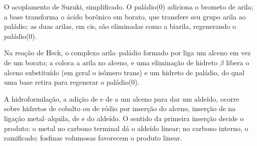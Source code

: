 \begin{omfigure}

{\small O acoplamento de Suzuki, simplificado. O paládio(0) adiciona o brometo de
arila; a base transforma o ácido borônico em borato, que transfere seu grupo
arila ao paládio; as duas arilas, em cis, são eliminadas como a biarila,
regenerando o paládio(0).}
\end{omfigure}

Na reação de Heck, o complexo arila--paládio formado por  liga
um alceno em vez de um borato; a  coloca a arila no alceno,
e uma eliminação de hidreto $\beta$ libera o alceno substituído (em geral o
isômero trans) e um hidreto de paládio, do qual uma base retira  para
regenerar o paládio(0).

A hidroformilação, a adição de  e de  a um alceno para dar um
aldeído, ocorre sobre hidretos de cobalto ou de ródio por inserção do alceno,
inserção de  na ligação metal--alquila,  de  e
 do aldeído. O sentido da primeira inserção decide o
produto: o metal no carbono terminal dá o aldeído linear; no carbono interno,
o ramificado; fosfinas volumosas favorecem o produto linear.

